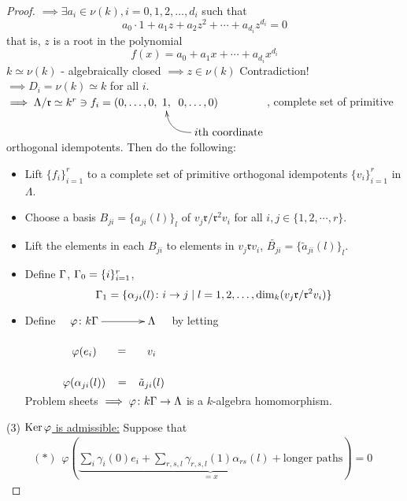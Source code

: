 \begin{proof}
$\implies \exists a_i \in \nu(k), i = 0, 1, 2, \ldots, d_i$ such
that \[ a_0 \cdot 1 + a_1 z + a_2 z^2 + \cdots + a_{d_i}z^{d_i} = 0\] 
that is, $z$ is a root in the polynomial 
\[ f(x) = a_0 + a_1 x + \cdots + a_{d_i}x^{d_i} \]
$k \simeq \nu(k)$ - algebraically closed $\implies z \in \nu(k)$ Contradiction!\\
$\implies D_i = \nu(k) \simeq k$ for all $i$.\\
$\implies \Lambda / \mathfrak{r} \simeq k^r \ni f_i = (0, \ldots, 0, 
\xymatrix@C-3pc@R-1pc{1, & 0, \ldots, 0)\\
&  *+[r]{i\text{th coordinate}} \ar@/^1pc/[ul] }$, complete set of
primitive orthogonal idempotents. Then do the following:
\begin{itemize}
\item Lift $\{ f_i \}_{i=1}^r$ to a complete set of primitive orthogonal idempotents $\{ v_i \}_{i=1}^r$  in $\Lambda$.
\item Choose a basis $B_{ji} = \{ a_{ji}(l) \}_l$ of $v_j \mathfrak{r} / \mathfrak{r}^2 v_i$ for all $i, j \in \{ 1, 2, \cdots, r \}$.

\item Lift the elements in each $B_{ji}$ to elements in $v_j \mathfrak{r} v_i$, $\tilde{B_{ji}} = \{ \tilde{a}_{ji}(l) \}_l$.

\item Define $\Gamma$, $\Gamma_0 = \{ i \}_{i=1}^r$, \[ \Gamma_1 = \{ \alpha_{ji}(l)\colon i \to j \mid l = 1, 2, \ldots, \dim_k(v_j \mathfrak{r} / \mathfrak{r}^2 v_i) \} \]

\item Define $\xymatrix@R-1pc{
\varphi\colon k\G \ar[r] & \Lambda\\
\varphi(e_i) \ar@{}[r]|-*[@]{=} & v_i\\
\varphi(\alpha_{ji}(l)) \ar@{}[r]|-*[@]{=} & \tilde{a}_{ji}(l)\\
}$ by letting\\
Problem sheets $\implies \varphi\colon k\Gamma \to \Lambda$ is a $k$-algebra homomorphism.
\end{itemize}

(3) \underline{$\operatorname{Ker}\nolimits \varphi$ is admissible:} Suppose that 
\begin{equation*}(*)
\begin{split}
\varphi \left( \underbrace{\sum_i \gamma_i(0)e_i + \sum_{r,s,l} \gamma_{r,s,l}(1)\alpha_{rs}(l) + \text{longer paths} }_{=x}\right) = 0 
\end{split}
\end{equation*}


\end{proof}
